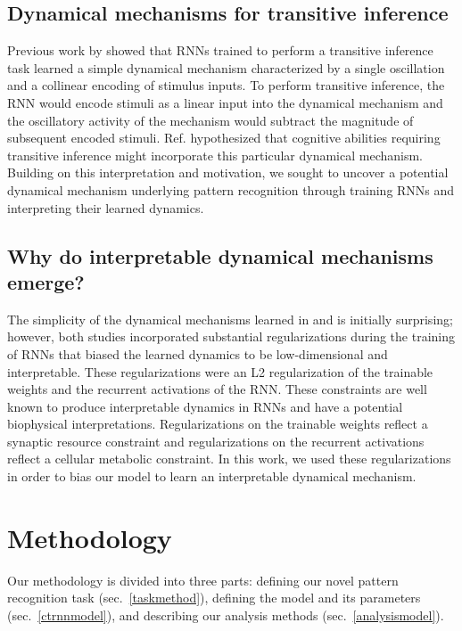 \documentclass[conference]{IEEEtran}
\begin{document}
\subsection{Dynamical mechanisms for transitive inference}

Previous work by \cite{kay2022neural} showed that RNNs trained to perform a transitive inference task learned a simple dynamical mechanism characterized by a single oscillation and a collinear encoding of stimulus inputs. To perform transitive inference, the RNN would encode stimuli as a linear input into the dynamical mechanism and the oscillatory activity of the mechanism would subtract the magnitude of subsequent encoded stimuli. Ref. \cite{kay2022neural} hypothesized that cognitive abilities requiring transitive inference might incorporate this particular dynamical mechanism. Building on this interpretation and motivation, we sought to uncover a potential dynamical mechanism underlying pattern recognition through training RNNs and interpreting their learned dynamics.

\subsection{Why do interpretable dynamical mechanisms emerge?}
\label{interpretablemotifs}

The simplicity of the dynamical mechanisms learned in \cite{driscoll2022flexible} and \cite{kay2022neural} is initially surprising; however, both studies incorporated substantial regularizations during the training of RNNs that biased the learned dynamics to be low-dimensional and interpretable. These regularizations were an L2 regularization of the trainable weights and the recurrent activations of the RNN. These constraints are well known to produce interpretable dynamics in RNNs and have a potential biophysical interpretations. Regularizations on the trainable weights reflect a synaptic resource constraint and regularizations on the recurrent activations reflect a cellular metabolic constraint\cite{sussillo2015neural,cueva2018emergence}. In this work, we used these regularizations in order to bias our model to learn an interpretable dynamical mechanism.

\section{Methodology}
Our methodology is divided into three parts: defining our novel pattern recognition task (sec.~\ref{taskmethod}), defining the model and its parameters (sec.~\ref{ctrnnmodel}), and describing our analysis methods (sec.~\ref{analysismodel}).
\end{document}
